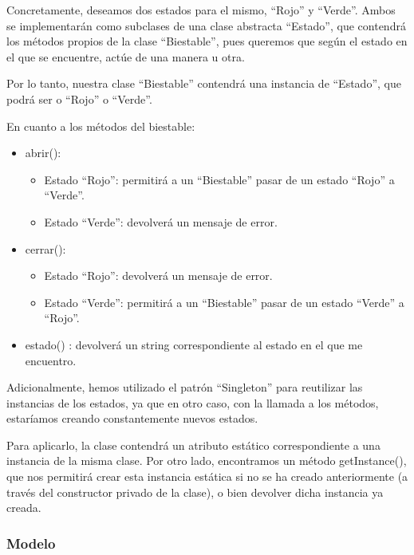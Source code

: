 \documentclass[11pt,a4paper]{article}
\begin{document}
Concretamente, deseamos dos estados para el mismo, ``Rojo'' y ``Verde''. Ambos se implementarán como subclases de una clase abstracta ``Estado'', que contendrá los métodos propios de la clase ``Biestable'', pues queremos que según el estado en el que se encuentre, actúe de una manera u otra.

Por lo tanto, nuestra clase ``Biestable'' contendrá una instancia de ``Estado'', que podrá ser o ``Rojo'' o ``Verde''.

En cuanto a los métodos del biestable:

\begin{itemize}
\item abrir():

	\begin{itemize}
	\item Estado ``Rojo'': permitirá a un ``Biestable'' pasar de un estado ``Rojo'' a ``Verde''.
	\item Estado ``Verde'': devolverá un mensaje de error.
	\end{itemize}
	
\item cerrar():

	\begin{itemize}
	\item Estado ``Rojo'': devolverá un mensaje de error.
	\item Estado ``Verde'':  permitirá a un ``Biestable'' pasar de un estado ``Verde'' a ``Rojo''.

	\end{itemize}
	
\item estado() : devolverá un string correspondiente al estado en el que me encuentro.
\end{itemize}

Adicionalmente, hemos utilizado el patrón “Singleton” para reutilizar las instancias de los estados, ya que en otro caso, con la llamada a los métodos, estaríamos creando constantemente nuevos estados.

Para aplicarlo, la clase contendrá un atributo estático correspondiente a una instancia de la misma clase. Por otro lado, encontramos un método getInstance(), que nos permitirá crear esta instancia estática si no se ha creado anteriormente (a través del constructor privado de la clase), o bien devolver dicha instancia ya creada.


\subsubsection{Modelo}
\end{document}
